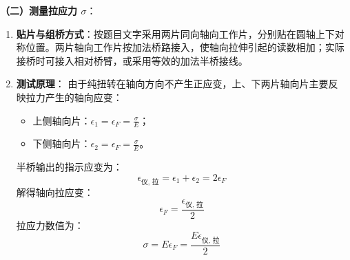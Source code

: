 \documentclass[11pt,a4paper]{ctexrep}
\begin{document}
{\textbf{（二）测量拉应力 $\sigma$}：
\begin{enumerate}
    \item \textbf{贴片与组桥方式}：按题目文字采用两片同向轴向工作片，分别贴在圆轴上下对称位置。两片轴向工作片按加法桥路接入，使轴向拉伸引起的读数相加；实际接桥时可接入相对桥臂，或采用等效的加法半桥接线。
    \item \textbf{测试原理}：
          由于纯扭转在轴向方向不产生正应变，上、下两片轴向片主要反映拉力产生的轴向应变：
          \begin{itemize}
              \item 上侧轴向片：$\epsilon_1=\epsilon_F=\frac{\sigma}{E}$；
              \item 下侧轴向片：$\epsilon_2=\epsilon_F=\frac{\sigma}{E}$。
          \end{itemize}
          半桥输出的指示应变为：
          \[
              \epsilon_{\text{仪, 拉}}=\epsilon_1+\epsilon_2=2\epsilon_F
          \]
          解得轴向拉应变：
          \[
              \epsilon_F=\frac{\epsilon_{\text{仪, 拉}}}{2}
          \]
          拉应力数值为：
          \[
              \sigma=E\epsilon_F=\frac{E\epsilon_{\text{仪, 拉}}}{2}
          \]
\end{enumerate}


}
\end{document}
